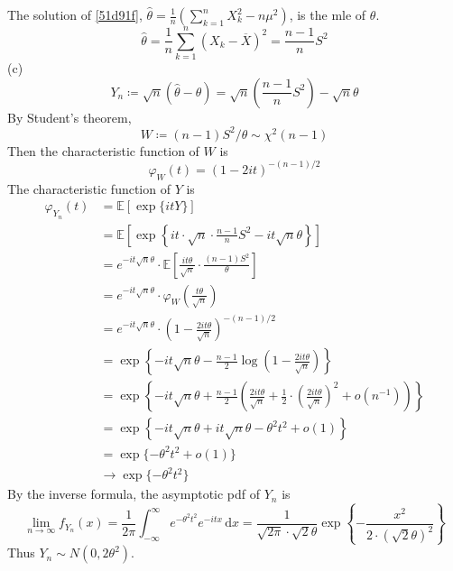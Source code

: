 The solution of \cref{51d91f}, $\widehat{\theta}=\frac{1}{n}\left( \sum_{k=1}^{n}X_k^2 -n\mu^{2}\right)$, is the mle of $\theta$.
\[
\widehat{\theta}=\frac{1}{n}\sum_{k=1}^{n} (X_k-\overline{X})^2=\frac{n-1}{n}S^2
\]
(c)
\[
Y_n\coloneqq \sqrt{ n }(\widehat{\theta}-\theta)=\sqrt{ n }\left( \frac{n-1}{n}S^2 \right)-\sqrt{ n }\theta
\]
By Student's theorem,
\[
W\coloneqq (n-1)S^2/\theta \sim \chi^{2}(n-1)
\]
Then the characteristic function of $W$ is
\[
\varphi_{W}(t) =(1-2it)^{-(n-1)/2}
\]
The characteristic function of $Y$ is
\[
\begin{aligned}
\varphi_{Y_n}(t) & =\mathbb{E}[\exp \{ itY \}] \\
 & =\mathbb{E}\left[ \exp \left\{  it\cdot \sqrt{ n }\cdot\frac{n-1}{n}S^2-it\sqrt{ n }\theta  \right\} \right] \\
 & =e^{ -it\sqrt{ n }\theta }\cdot \mathbb{E}\left[ \frac{it\theta }{\sqrt{ n }}\cdot\frac{(n-1)S^2}{\theta} \right] \\
 & =e^{ -it\sqrt{ n }\theta }\cdot\varphi_{W}\left( \frac{t\theta }{\sqrt{ n }} \right) \\
 & =e^{ -it\sqrt{ n }\theta }\cdot\left( 1-\frac{2it\theta}{ \sqrt{ n }}  \right)^{-(n-1)/2} \\
 & =\exp \left\{  -it\sqrt{ n }\theta-\frac{n-1}{2}\log\left( 1-\frac{2it\theta}{\sqrt{ n }} \right)  \right\} \\
 & =\exp \left\{  -it\sqrt{ n }\theta +\frac{n-1}{2} \left( \frac{2it\theta}{ \sqrt{ n }}+\frac{1}{2}\cdot\left( \frac{2it\theta}{ \sqrt{ n }} \right)^2+o(n^{-1}) \right)\right\} \\
 & =\exp \left\{  -it\sqrt{ n }\theta+ it\sqrt{ n }\theta-\theta^{2}t^2+o(1) \right\} \\
 & =\exp \{ -\theta^{2}t^2+o(1) \} \\
 & \to \exp \{ -\theta^{2}t^2 \}
\end{aligned}
\]
By the inverse formula, the asymptotic pdf of $Y_n$ is
\[
\lim_{ n \to \infty } f_{Y_n}(x)=\frac{1}{2\pi}\int_{-\infty}^{\infty} e^{ -\theta^{2}t^2 }e^{ -itx } \, \mathrm{d}x =\frac{1}{\sqrt{ 2\pi }\cdot \sqrt{ 2 }\theta}\exp \left\{  -\frac{x^2}{2\cdot(\sqrt{ 2 }\theta)^2}  \right\}
\]
Thus $Y_n\sim N(0,2\theta^{2})$.
